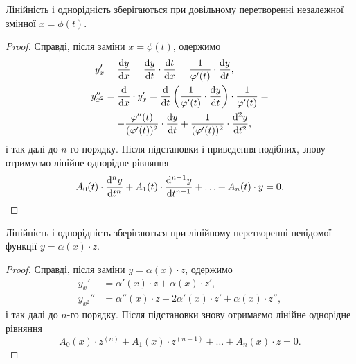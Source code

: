 \begin{theorem}
	Лінійність і однорідність зберігаються при довільному перетворенні незалежної змінної $x = \phi(t)$.
\end{theorem}
\begin{proof}
	Справді, після заміни $x = \phi(t)$, одержимо
	\begin{align*}
		y_x' &= \frac{\diff y}{\diff x} = \frac{\diff y}{\diff t} \cdot \frac{\diff t}{\diff x} = \frac{1}{\phi'(t)} \cdot \frac{\diff y}{\diff t}, \\
		y_{x^2}'' &= \frac{\diff}{\diff x} \cdot y_x' = \frac{\diff}{\diff t} \left( \frac{1}{\phi'(t)} \cdot \frac{\diff y}{\diff t} \right) \cdot \frac{1}{\phi'(t)} = \\
		&= - \frac{\phi''(t)}{(\phi'(t))^2} \cdot \frac{\diff y}{\diff t} + \frac{1}{(\phi'(t))^2} \cdot \frac{\diff^2 y}{\diff t^2}, \nonumber
	\end{align*}
	і так далі до $n$-го порядку. Після підстановки і приведення подібних, знову отримуємо лінійне однорідне рівняння
	\begin{equation*}
		A_0(t) \cdot \frac{\mathop{}\!\mathrm{d}^n y}{\mathop{}\!\mathrm{d} t^n} + A_1(t) \cdot \frac{\mathop{}\!\mathrm{d}^{n - 1} y}{\mathop{}\!\mathrm{d} t^{n - 1}} + \ldots + A_n(t) \cdot y = 0.
	\end{equation*}
\end{proof}

\begin{theorem}
	Лінійність і однорідність зберігаються при лінійному перетворенні невідомої функції $y = \alpha (x) \cdot z$.
\end{theorem}
\begin{proof}
	Справді, після заміни $y = \alpha (x) \cdot z$, одержимо
	\begin{align*}
		y_x' &= \alpha'(x) \cdot z + \alpha(x) \cdot z', \\
		y_{x^2}'' &= \alpha''(x) \cdot z + 2 \alpha'(x) \cdot z' + \alpha(x) \cdot z'',
	\end{align*}
	і так далі до $n$-го порядку. Після підстановки знову отримаємо лінійне однорідне рівняння
	\begin{equation*}
		\bar A_0(x) \cdot z^{(n)} + \bar A_1(x) \cdot z^{(n - 1)} + \ldots + \bar A_n(x) \cdot z = 0.
	\end{equation*}
\end{proof}